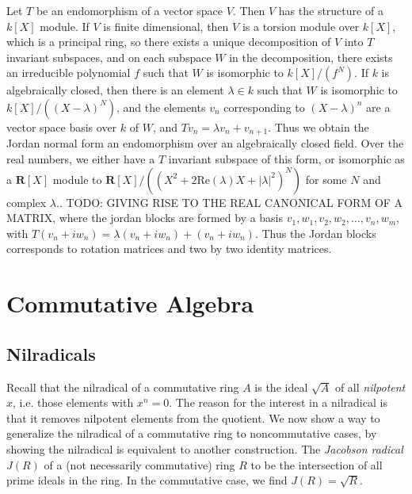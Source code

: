 \begin{example}
    Let $T$ be an endomorphism of a vector space $V$. Then $V$ has the structure of a $k[X]$ module. If $V$ is finite dimensional, then $V$ is a torsion module over $k[X]$, which is a principal ring, so there exists a unique decomposition of $V$ into $T$ invariant subspaces, and on each subspace $W$ in the decomposition, there exists an irreducible polynomial $f$ such that $W$ is isomorphic to $k[X]/(f^N)$. If $k$ is algebraically closed, then there is an element $\lambda \in k$ such that $W$ is isomorphic to $k[X]/((X - \lambda)^N)$, and the elements $v_n$ corresponding to $(X - \lambda)^n$ are a vector space basis over $k$ of $W$, and $Tv_n = \lambda v_n + v_{n+1}$. Thus we obtain the Jordan normal form an endomorphism over an algebraically closed field. Over the real numbers, we either have a $T$ invariant subspace of this form, or isomorphic as a $\mathbf{R}[X]$ module to $\mathbf{R}[X]/((X^2 + 2 \text{Re}(\lambda) X + |\lambda|^2)^N)$ for some $N$ and complex $\lambda$.. TODO: GIVING RISE TO THE REAL CANONICAL FORM OF A MATRIX, where the jordan blocks are formed by a basis $v_1,w_1, v_2, w_2, \dots, v_n,w_m$, with $T(v_n + iw_n) = \lambda(v_n + iw_n) + (v_n + iw_n)$. Thus the Jordan blocks corresponds to rotation matrices and two by two identity matrices.
\end{example}




\part{Commutative Algebra}

\chapter{Nilradicals}

Recall that the nilradical of a commutative ring $A$ is the ideal $\sqrt{A}$ of all {\it nilpotent} $x$, i.e. those elements with $x^n = 0$. The reason for the interest in a nilradical is that it removes nilpotent elements from the quotient. We now show a way to generalize the nilradical of a commutative ring to noncommutative cases, by showing the nilradical is equivalent to another construction. The \emph{Jacobson radical} $J(R)$ of a (not necessarily commutative) ring $R$ to be the intersection of all prime ideals in the ring. In the commutative case, we find $J(R) = \sqrt{R}$.

